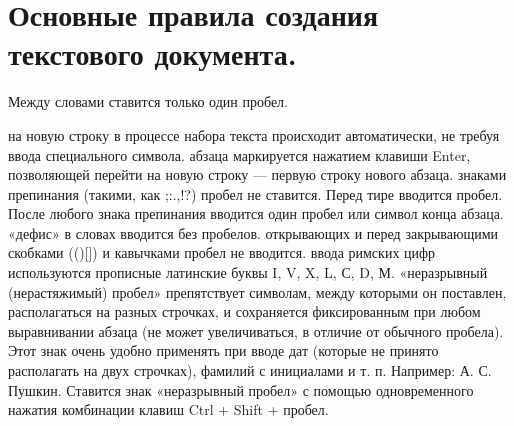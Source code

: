 \documentclass[a4paper,12pt]{article} %
\begin{document}
\section{Основные правила создания текстового документа.}
\hspace{15mm}Между словами ставится только один пробел.
\begin{itemize}
 на новую строку в процессе набора текста происходит автоматически, не требуя ввода специального символа.
 абзаца маркируется нажатием клавиши Enter, позволяющей перейти на новую строку — первую строку нового абзаца.
 знаками препинания (такими, как ;:.,!?) пробел не ставится. Перед тире вводится пробел. После любого знака препинания вводится один пробел или символ конца абзаца.
 «дефис» в словах вводится без пробелов.
 открывающих и перед закрывающими скобками ({}()[]) и кавычками пробел не вводится.
 ввода римских цифр используются прописные латинские буквы I, V, X, L, С, D, М.
 «неразрывный (нерастяжимый) пробел» препятствует символам, между которыми он поставлен, располагаться на разных строчках, и сохраняется фиксированным при любом выравнивании абзаца (не может увеличиваться, в отличие от обычного пробела). Этот знак очень удобно применять при вводе дат (которые не принято располагать на двух строчках), фамилий с инициалами и т. п. Например: А. С. Пушкин. Ставится знак «неразрывный пробел» с помощью одновременного нажатия комбинации клавиш Ctrl + Shift + пробел.
\end{itemize}
\end{document}
